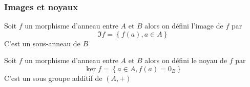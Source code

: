 \documentclass[11pt,colorlinks]{book}
\theoremstyle{mytheoremstyle}
\theoremstyle{mytheoremstyle}
\theoremstyle{mytheoremstyle}
\theoremstyle{mytheoremstyle}
\theoremstyle{mytheoremstyle}
\theoremstyle{mytheoremstyle}
\theoremstyle{mytheoremstyle}
\theoremstyle{mytheoremstyle}
\theoremstyle{myproblemstyle}
\begin{document}
\subsubsection{Images et noyaux}
\begin{definition}
  Soit $f$ un morphisme d'anneau entre $A$ et $B$ alors on défini l'image de $f$ par 
  \begin{equation*}
    \Im f = \left\{f(a), a \in A\right\}
  \end{equation*}
  C'est un sous-anneau de $B$
\end{definition}
\begin{definition}
  Soit $f$ un morphisme d'anneau entre $A$ et $B$ alors on défini le noyau de $f$ par 
  \begin{equation*}
    \ker f = \left\{a \in A, f(a) = 0_B\right\}
  \end{equation*}
  C'est un sous groupe additif de $(A,+)$
\end{definition}
\end{document}
